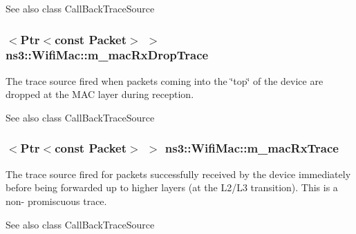 \begin{DoxySeeAlso}{See also}
class Call\+Back\+Trace\+Source 
\end{DoxySeeAlso}
\subsubsection[{\texorpdfstring{m\+\_\+mac\+Rx\+Drop\+Trace}{m_macRxDropTrace}}]{$<${\bf Ptr}$<$const {\bf Packet}$>$ $>$ ns3\+::\+Wifi\+Mac\+::m\+\_\+mac\+Rx\+Drop\+Trace\hspace{0.3cm}{\ttfamily [private]}}\hypertarget{classns3_1_1WifiMac_aaacf17caeadb826164ee3efbc87fecd5}{}\label{classns3_1_1WifiMac_aaacf17caeadb826164ee3efbc87fecd5}
The trace source fired when packets coming into the \char`\"{}top\char`\"{} of the device are dropped at the M\+AC layer during reception.

\begin{DoxySeeAlso}{See also}
class Call\+Back\+Trace\+Source 
\end{DoxySeeAlso}
\subsubsection[{\texorpdfstring{m\+\_\+mac\+Rx\+Trace}{m_macRxTrace}}]{$<${\bf Ptr}$<$const {\bf Packet}$>$ $>$ ns3\+::\+Wifi\+Mac\+::m\+\_\+mac\+Rx\+Trace\hspace{0.3cm}{\ttfamily [private]}}\hypertarget{classns3_1_1WifiMac_a89965d25d0d4b93890534e2dd2a31e2f}{}\label{classns3_1_1WifiMac_a89965d25d0d4b93890534e2dd2a31e2f}
The trace source fired for packets successfully received by the device immediately before being forwarded up to higher layers (at the L2/\+L3 transition). This is a non-\/ promiscuous trace.

\begin{DoxySeeAlso}{See also}
class Call\+Back\+Trace\+Source 
\end{DoxySeeAlso}
